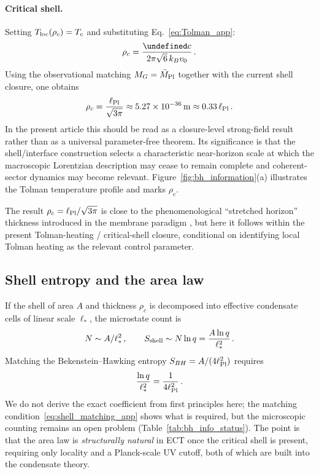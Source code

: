 \documentclass[11pt,a4paper]{article}
\let\hbar\undefined
\numberwithin{equation}{section}
\begin{document}
\paragraph{Critical shell.}
Setting $T_{\rm loc}(\rho_c)=T_c$ and substituting
Eq.~\eqref{eq:Tolman_app}:
\begin{equation}
\rho_c
=
\frac{\hbar c}{2\pi\sqrt{6}\,k_B v_0}\,.
\label{eq:rho_c_app}
\end{equation}
Using the observational matching
$M_G=\bar M_{\rm Pl}$ together with the current shell closure,
one obtains
\begin{equation}
\rho_c
=
\frac{\ell_{\rm Pl}}{\sqrt{3\pi}}
\approx 5.27\times10^{-36}\,\text{m}
\approx 0.33\,\ell_{\rm Pl}\,.
\label{eq:rho_c_analytic}
\end{equation}
In the present article this should be read as a closure-level
strong-field result rather than as a universal parameter-free theorem.
Its significance is that the shell/interface construction selects a
characteristic near-horizon scale at which the macroscopic Lorentzian
description may cease to remain complete and coherent-sector dynamics
may become relevant.
Figure~\ref{fig:bh_information}(a) illustrates the Tolman temperature
profile and marks $\rho_c$.

The result $\rho_c=\ell_{\rm Pl}/\sqrt{3\pi}$ is close to the phenomenological
``stretched horizon'' thickness introduced in the membrane paradigm
\cite{PriceThorne1986}, but here it follows within the present Tolman-heating / critical-shell
closure, conditional on identifying local Tolman heating as the relevant
control parameter.

\subsection{Shell entropy and the area law}
\label{app:shell_entropy}

If the shell of area $A$ and thickness $\rho_c$ is decomposed into effective
condensate cells of linear scale $\ell_*$, the microstate count is
\begin{equation}
N\sim A/\ell_*^2\,,\qquad S_{\rm shell}\sim N\ln q = \frac{A\ln q}{\ell_*^2}\,.
\label{eq:S_shell_app}
\end{equation}
Matching the Bekenstein--Hawking entropy $S_{BH}=A/(4\ell_{\rm Pl}^2)$
\cite{Bekenstein1973} requires
\begin{equation}
\frac{\ln q}{\ell_*^2}=\frac{1}{4\ell_{\rm Pl}^2}\,.
\label{eq:shell_matching_app}
\end{equation}
We do not derive the exact coefficient from first principles here;
the matching condition~\eqref{eq:shell_matching_app} shows what is required,
but the microscopic counting remains an open problem
(Table~\ref{tab:bh_info_status}).
The point is that the area law is \emph{structurally natural} in ECT once the
critical shell is present, requiring only locality and a Planck-scale UV cutoff,
both of which are built into the condensate theory.
\end{document}
